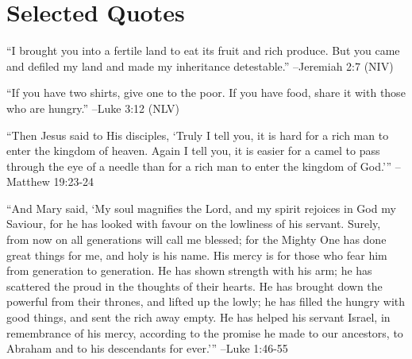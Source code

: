 \documentclass{article}%
\begin{document}
%
\large%
\section{Selected Quotes}%
\label{sec:SelectedQuotes}%
\begin{minipage}{\textwidth}%
\flushleft%
“I brought you into a fertile land to eat its fruit and rich produce. But you came and defiled my land and made my inheritance detestable.”%
\linebreak%
\vspace{1mm}%
–Jeremiah 2:7 (NIV)%
\linebreak%
\vspace{1mm}%
\end{minipage}%
\linebreak%
\vspace{1mm}%
\begin{minipage}{\textwidth}%
\flushleft%
“If you have two shirts, give one to the poor. If you have food, share it with those who are hungry.”%
\linebreak%
\vspace{1mm}%
–Luke 3:12 (NLV)%
\linebreak%
\vspace{1mm}%
\end{minipage}%
\linebreak%
\vspace{1mm}%
\begin{minipage}{\textwidth}%
\flushleft%
“Then Jesus said to His disciples, ‘Truly I tell you, it is hard for a rich man to enter the kingdom of heaven. Again I tell you, it is easier for a camel to pass through the eye of a needle than for a rich man to enter the kingdom of God.’”%
\linebreak%
\vspace{1mm}%
–Matthew 19:23{-}24%
\linebreak%
\vspace{1mm}%
\end{minipage}%
\linebreak%
\vspace{1mm}%
\begin{minipage}{\textwidth}%
\flushleft%
“And Mary said, ‘My soul magnifies the Lord, and my spirit rejoices in God my Saviour, for he has looked with favour on the lowliness of his servant. Surely, from now on all generations will call me blessed; for the Mighty One has done great things for me, and holy is his name. His mercy is for those who fear him from generation to generation. He has shown strength with his arm; he has scattered the proud in the thoughts of their hearts. He has brought down the powerful from their thrones, and lifted up the lowly; he has filled the hungry with good things, and sent the rich away empty. He has helped his servant Israel, in remembrance of his mercy, according to the promise he made to our ancestors, to Abraham and to his descendants for ever.’”%
\linebreak%
\vspace{1mm}%
–Luke 1:46{-}55%
\linebreak%
\vspace{1mm}%
\end{minipage}%
\end{document}
